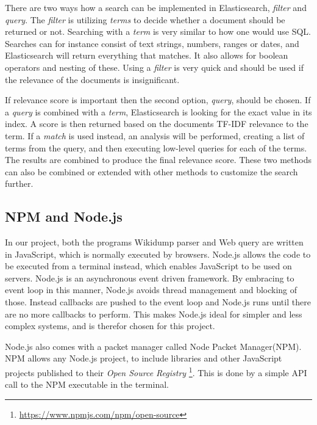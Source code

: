 There are two ways how a search can be implemented in Elasticsearch, \textit{filter} and \textit{query}. The \textit{filter} is utilizing \textit{terms} to decide whether a document should be returned or not. Searching with a \textit{term} is very similar to how one would use SQL. 
Searches can for instance consist of text strings, numbers, ranges or dates, and Elasticsearch will return everything that matches. It also allows for boolean operators and nesting of these. Using a \textit{filter} is very quick and should be used if the relevance of the documents is insignificant.

If relevance score is important then the second option, \textit{query}, should be chosen. If a \textit{query} is combined with a \textit{term}, Elasticsearch is looking for the exact value in its index. A score is then returned based on the documents TF-IDF relevance to the term. If a \textit{match} is used instead, an analysis will be performed, creating a list of terms from the query, and then executing low-level queries for each of the terms. The results are combined to produce the final relevance score. These two methods can also be combined or extended with other methods to customize the search further.


\subsection{NPM and Node.js}
In our project, both the programs Wikidump parser and Web query are written in JavaScript, which is normally executed by browsers. Node.js\cite{node} allows the code to be executed from a terminal instead, which enables JavaScript to be used on servers.  Node.js is an asynchronous event driven framework. By embracing to event loop in this manner, Node.js avoids thread management and blocking of those. Instead callbacks are pushed to the event loop and Node.js runs until there are no more callbacks to perform. This makes Node.js ideal for simpler and less complex systems, and is therefor chosen for this project.

Node.js also comes with a packet manager called Node Packet Manager(NPM). NPM allows any Node.js project, to include libraries and other JavaScript projects published to their \textit{Open Source Registry} \footnote{\url{https://www.npmjs.com/npm/open-source}}. This is done by a simple API call to the NPM executable in the terminal.

